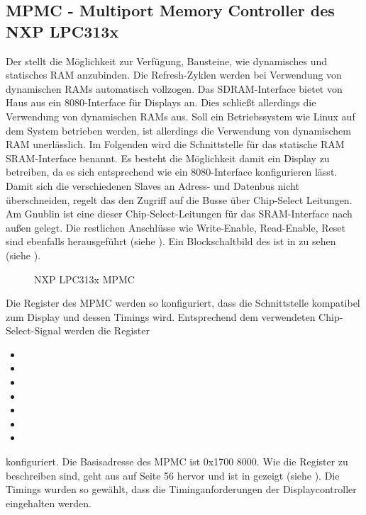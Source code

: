 \subsection{MPMC - Multiport Memory Controller des NXP LPC313x}
\label{cha:mpmc}

Der  stellt die Möglichkeit zur Verfügung, Bausteine, wie dynamisches und statisches RAM anzubinden. Die Refresh-Zyklen werden bei Verwendung von dynamischen RAMs automatisch vollzogen. Das SDRAM-Interface bietet von Haus aus ein 8080-Interface für Displays an. Dies schließt allerdings die Verwendung von dynamischen RAMs aus. Soll ein Betriebssystem wie Linux auf dem System betrieben werden, ist allerdings die Verwendung von dynamischem RAM unerlässlich. Im Folgenden wird die Schnittstelle für das statische RAM SRAM-Interface benannt. Es besteht die Möglichkeit damit ein Display zu betreiben, da es sich entsprechend wie ein 8080-Interface konfigurieren lässt. Damit sich die verschiedenen Slaves an Adress- und Datenbus nicht überschneiden, regelt das  den Zugriff auf die Busse über Chip-Select Leitungen. Am Gnublin ist eine dieser Chip-Select-Leitungen für das SRAM-Interface nach außen gelegt. Die restlichen Anschlüsse wie Write-Enable, Read-Enable, Reset sind ebenfalls herausgeführt (siehe \cite{NXP2010}). Ein Blockschaltbild des  ist in  zu sehen (siehe \cite{NXP2010}).


\begin{figure}[tbph]
	\centering
{}
	\caption{NXP LPC313x MPMC}
	\label{fig:lpc_mpmc}
\end{figure}
\newpage
Die Register des MPMC werden so konfiguriert, dass die Schnittstelle kompatibel zum Display und dessen Timings wird. Entsprechend dem verwendeten Chip-Select-Signal werden die Register \begin{itemize}
\item {}
\item {}
\item  {}
\item  {}
\item  {}
\item  {}
\item {}
\end{itemize} konfiguriert. Die Basisadresse des MPMC ist 0x1700 8000. Wie die Register zu beschreiben sind, geht aus \cite{NXP2010} auf Seite 56 hervor und ist in  gezeigt (siehe \cite{NXP2010}). Die Timings wurden so gewählt, dass die Timinganforderungen der Displaycontroller eingehalten werden.

